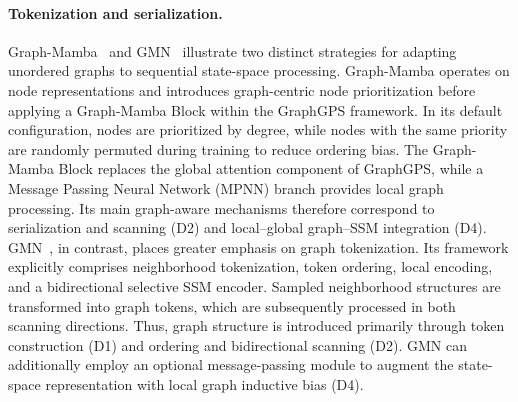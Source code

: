 \documentclass[acmsmall]{acmart}
\begin{document}
\paragraph{\textbf{Tokenization and serialization.}}
Graph-Mamba~\cite{wang2024graph} and GMN~\cite{behrouz2024graph}
illustrate two distinct strategies for adapting unordered graphs to sequential
state-space processing. Graph-Mamba operates on node representations and
introduces graph-centric node prioritization before applying a Graph-Mamba
Block within the GraphGPS framework. In its default configuration, nodes are
prioritized by degree, while nodes with the same priority are randomly
permuted during training to reduce ordering bias. The Graph-Mamba Block
replaces the global attention component of GraphGPS, while a Message Passing Neural Network (MPNN) branch
provides local graph processing. Its main graph-aware mechanisms therefore
correspond to serialization and scanning (D2) and local--global graph--SSM
integration (D4).
GMN~\cite{behrouz2024graph}, in contrast, places greater emphasis on graph
tokenization. Its framework explicitly comprises neighborhood tokenization,
token ordering, local encoding, and a bidirectional selective SSM encoder.
Sampled neighborhood structures are transformed into graph tokens, which are
subsequently processed in both scanning directions. Thus, graph structure is
introduced primarily through token construction (D1) and ordering and
bidirectional scanning (D2). GMN can additionally employ an optional
message-passing module to augment the state-space representation with local
graph inductive bias (D4).
\end{document}
